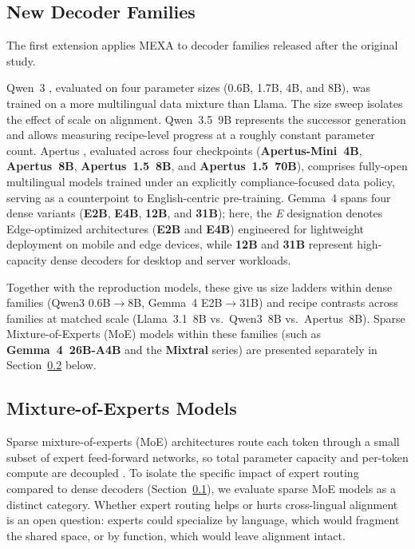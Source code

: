 \subsection{New Decoder Families}
\label{subsec:new-decoders}

The first extension applies MEXA to decoder families released after the original study.

Qwen~3 \citep{yang2025qwen3}, evaluated on four parameter sizes (0.6B, 1.7B, 4B, and 8B), was trained on a more multilingual data mixture than Llama. The size sweep isolates the effect of scale on alignment. Qwen~3.5~9B represents the successor generation and allows measuring recipe-level progress at a roughly constant parameter count. Apertus \citep{apertus2025}, evaluated across four checkpoints (\textbf{Apertus-Mini~4B}, \textbf{Apertus~8B}, \textbf{Apertus~1.5~8B}, and \textbf{Apertus~1.5~70B}), comprises fully-open multilingual models trained under an explicitly compliance-focused data policy, serving as a counterpoint to English-centric pre-training. Gemma~4 \citep{gemmateam2026gemma4technicalreport} spans four dense variants (\textbf{E2B}, \textbf{E4B}, \textbf{12B}, and \textbf{31B}); here, the \textit{E} designation denotes Edge-optimized architectures (\textbf{E2B} and \textbf{E4B}) engineered for lightweight deployment on mobile and edge devices, while \textbf{12B} and \textbf{31B} represent high-capacity dense decoders for desktop and server workloads.

\noindent
Together with the reproduction models, these give us size ladders within dense families (Qwen3 0.6B$\to$8B, Gemma~4 E2B$\to$31B) and recipe contrasts across families at matched scale (Llama~3.1~8B vs.\ Qwen3~8B vs.\ Apertus~8B). Sparse Mixture-of-Experts (MoE) models within these families (such as \textbf{Gemma~4~26B-A4B} and the \textbf{Mixtral} series) are presented separately in Section~\ref{subsec:moe-models} below.

\subsection{Mixture-of-Experts Models}
\label{subsec:moe-models}

Sparse mixture-of-experts (MoE) architectures route each token through a small subset of expert feed-forward networks, so total parameter capacity and per-token compute are decoupled \citep{jiang2024mixtral}. To isolate the specific impact of expert routing compared to dense decoders (Section~\ref{subsec:new-decoders}), we evaluate sparse MoE models as a distinct category. Whether expert routing helps or hurts cross-lingual alignment is an open question: experts could specialize by language, which would fragment the shared space, or by function, which would leave alignment intact.

